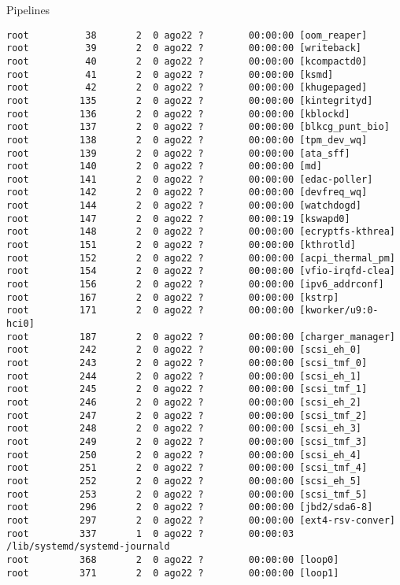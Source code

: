 \begin{section}{Pipelines}
\begin{lstlisting}[style=Ubuntu]
root          38       2  0 ago22 ?        00:00:00 [oom_reaper]
root          39       2  0 ago22 ?        00:00:00 [writeback]
root          40       2  0 ago22 ?        00:00:00 [kcompactd0]
root          41       2  0 ago22 ?        00:00:00 [ksmd]
root          42       2  0 ago22 ?        00:00:00 [khugepaged]
root         135       2  0 ago22 ?        00:00:00 [kintegrityd]
root         136       2  0 ago22 ?        00:00:00 [kblockd]
root         137       2  0 ago22 ?        00:00:00 [blkcg_punt_bio]
root         138       2  0 ago22 ?        00:00:00 [tpm_dev_wq]
root         139       2  0 ago22 ?        00:00:00 [ata_sff]
root         140       2  0 ago22 ?        00:00:00 [md]
root         141       2  0 ago22 ?        00:00:00 [edac-poller]
root         142       2  0 ago22 ?        00:00:00 [devfreq_wq]
root         144       2  0 ago22 ?        00:00:00 [watchdogd]
root         147       2  0 ago22 ?        00:00:19 [kswapd0]
root         148       2  0 ago22 ?        00:00:00 [ecryptfs-kthrea]
root         151       2  0 ago22 ?        00:00:00 [kthrotld]
root         152       2  0 ago22 ?        00:00:00 [acpi_thermal_pm]
root         154       2  0 ago22 ?        00:00:00 [vfio-irqfd-clea]
root         156       2  0 ago22 ?        00:00:00 [ipv6_addrconf]
root         167       2  0 ago22 ?        00:00:00 [kstrp]
root         171       2  0 ago22 ?        00:00:00 [kworker/u9:0-hci0]
root         187       2  0 ago22 ?        00:00:00 [charger_manager]
root         242       2  0 ago22 ?        00:00:00 [scsi_eh_0]
root         243       2  0 ago22 ?        00:00:00 [scsi_tmf_0]
root         244       2  0 ago22 ?        00:00:00 [scsi_eh_1]
root         245       2  0 ago22 ?        00:00:00 [scsi_tmf_1]
root         246       2  0 ago22 ?        00:00:00 [scsi_eh_2]
root         247       2  0 ago22 ?        00:00:00 [scsi_tmf_2]
root         248       2  0 ago22 ?        00:00:00 [scsi_eh_3]
root         249       2  0 ago22 ?        00:00:00 [scsi_tmf_3]
root         250       2  0 ago22 ?        00:00:00 [scsi_eh_4]
root         251       2  0 ago22 ?        00:00:00 [scsi_tmf_4]
root         252       2  0 ago22 ?        00:00:00 [scsi_eh_5]
root         253       2  0 ago22 ?        00:00:00 [scsi_tmf_5]
root         296       2  0 ago22 ?        00:00:00 [jbd2/sda6-8]
root         297       2  0 ago22 ?        00:00:00 [ext4-rsv-conver]
root         337       1  0 ago22 ?        00:00:03 /lib/systemd/systemd-journald
root         368       2  0 ago22 ?        00:00:00 [loop0]
root         371       2  0 ago22 ?        00:00:00 [loop1]

\end{lstlisting}
\end{section}
